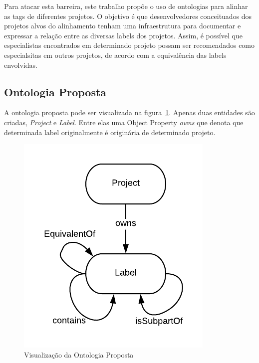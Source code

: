 \documentclass[sigconf]{acmart}
\begin{document}
Para atacar esta barreira, este trabalho propõe o uso de ontologias para alinhar as tags de diferentes projetos. O objetivo é que desenvolvedores conceituados dos projetos alvos do alinhamento tenham uma infraestrutura para documentar e expressar a relação entre as diversas labels dos projetos. Assim, é possível que especialistas encontrados em determinado projeto possam ser recomendados como especialsitas em outros projetos, de acordo com a equivalência das labels envolvidas.

\subsection{Ontologia Proposta}

A ontologia proposta pode ser visualizada na figura~\ref{fig:ontologia}. Apenas duas entidades são criadas, \textit{Project} e \textit{Label}. Entre elas uma Object Property \textit{owns} que denota que determinada label originalmente é originária de determinado projeto.

\begin{figure}[!htbp]
\centering
 \includegraphics[width=\columnwidth]{ontologia}
 \caption{Visualização da Ontologia Proposta}\label{fig:ontologia}
\end{figure}
\end{document}
